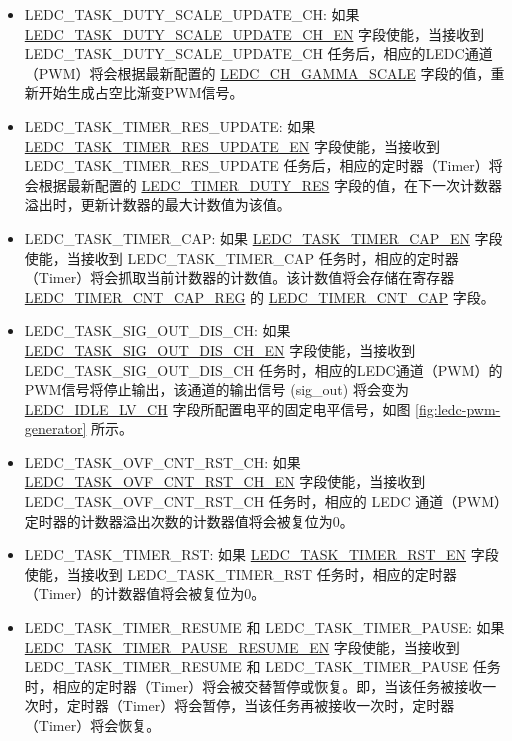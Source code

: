 \documentclass[main\_\_CN.tex]{subfiles}
\begin{document}
\begin{itemize}
\item LEDC\_TASK\_DUTY\_SCALE\_UPDATE\_CH: 如果 \hyperref[fielddesc:LEDCTASKDUTYSCALEUPDATECHNEN]{LEDC\_TASK\_DUTY\_SCALE\_UPDATE\_CH\_EN} 字段使能，当接收到 LEDC\_TASK\_DUTY\_SCALE\_UPDATE\_CH 任务后，相应的LEDC通道（PWM）将会根据最新配置的 \hyperref[fielddesc:LEDCCHNGAMMASCALE]{LEDC\_CH\_GAMMA\_SCALE} 字段的值，重新开始生成占空比渐变PWM信号。
\item LEDC\_TASK\_TIMER\_RES\_UPDATE: 如果 \hyperref[fielddesc:LEDCTASKTIMERXRESUPDATEEN]{LEDC\_TASK\_TIMER\_RES\_UPDATE\_EN} 字段使能，当接收到 LEDC\_TASK\_TIMER\_RES\_UPDATE 任务后，相应的定时器（Timer）将会根据最新配置的 \hyperref[fielddesc:LEDCTIMERXDUTYRES]{LEDC\_TIMER\_DUTY\_RES} 字段的值，在下一次计数器溢出时，更新计数器的最大计数值为该值。
\item LEDC\_TASK\_TIMER\_CAP: 如果 \hyperref[fielddesc:LEDCTASKTIMERXCAPEN]{LEDC\_TASK\_TIMER\_CAP\_EN} 字段使能，当接收到 LEDC\_TASK\_TIMER\_CAP 任务时，相应的定时器（Timer）将会抓取当前计数器的计数值。该计数值将会存储在寄存器 \hyperref[regdesc:LEDCTIMERXCNTCAPREG]{LEDC\_TIMER\_CNT\_CAP\_REG} 的 \hyperref[fielddesc:LEDCTIMERXCNTCAP]{LEDC\_TIMER\_CNT\_CAP} 字段。
\item LEDC\_TASK\_SIG\_OUT\_DIS\_CH: 如果 \hyperref[fielddesc:LEDCTASKSIGOUTDISCHNEN]{LEDC\_TASK\_SIG\_OUT\_DIS\_CH\_EN} 字段使能，当接收到 LEDC\_TASK\_SIG\_OUT\_DIS\_CH 任务时，相应的LEDC通道（PWM）的PWM信号将停止输出，该通道的输出信号 (sig\_out) 将会变为 \hyperref[fielddesc:LEDCIDLELVCHN]{LEDC\_IDLE\_LV\_CH} 字段所配置电平的固定电平信号，如图 \ref{fig:ledc-pwm-generator} 所示。
\item LEDC\_TASK\_OVF\_CNT\_RST\_CH: 如果 \hyperref[fielddesc:LEDCTASKOVFCNTRSTCHNEN]{LEDC\_TASK\_OVF\_CNT\_RST\_CH\_EN} 字段使能，当接收到 LEDC\_TASK\_OVF\_CNT\_RST\_CH 任务时，相应的 LEDC 通道（PWM）定时器的计数器溢出次数的计数器值将会被复位为0。
\item LEDC\_TASK\_TIMER\_RST: 如果 \hyperref[fielddesc:LEDCTASKTIMERXRSTEN]{LEDC\_TASK\_TIMER\_RST\_EN} 字段使能，当接收到 LEDC\_TASK\_TIMER\_RST 任务时，相应的定时器（Timer）的计数器值将会被复位为0。
\item LEDC\_TASK\_TIMER\_RESUME 和 LEDC\_TASK\_TIMER\_PAUSE: 如果 \hyperref[fielddesc:LEDCTASKTIMERXPAUSERESUMEEN]{LEDC\_TASK\_TIMER\_PAUSE\_RESUME\_EN} 字段使能，当接收到 LEDC\_TASK\_TIMER\_RESUME 和 LEDC\_TASK\_TIMER\_PAUSE 任务时，相应的定时器（Timer）将会被交替暂停或恢复。即，当该任务被接收一次时，定时器（Timer）将会暂停，当该任务再被接收一次时，定时器（Timer）将会恢复。

\end{itemize}
\end{document}
